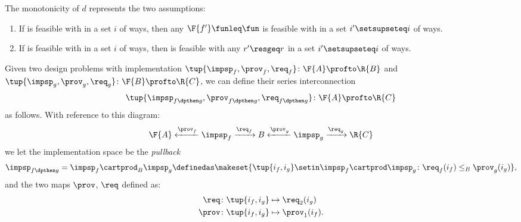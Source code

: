 {    \noindent The monotonicity of $d$ represents the two assumptions:
    \begin{enumerate}
        \item If \fun is feasible with \res in a set $i$ of ways, then any $\F{f'}\funleq \fun$ is feasible with \res in a set $i'\setsupseteq i$ of ways.
        \item If \fun is feasible with \res in a set $i$ of ways, then \fun is feasible with any $r'\resgeq r$ in a set $i'\setsupseteq i$ of ways.
    \end{enumerate}

    \begin{definition}
        \label{def:seriesdpi}
        Given two design problems with implementation $\tup{\impsp_f,\prov_f,\req_f}\colon \F{A}\profto \R{B}$ and $\tup{\impsp_g,\prov_g,\req_g}\colon \F{B}\profto \R{C}$, we can define their series interconnection
        \begin{equation}
            \tup{\impsp_{f\dpthen g},\prov_{f\dpthen g},\req_{f\dpthen g}}\colon \F{A}\profto \R{C}
        \end{equation}
        as follows.
        With reference to this diagram:
        \begin{equation}
            \F{A} \xleftarrow{\prov_f} \impsp_f \xrightarrow{\req_f} B
            \xleftarrow{\prov_g} \impsp_g \xrightarrow{\req_g} \R{C}
        \end{equation}
        we let the implementation space be the \emph{pullback}
        \begin{equation}
            \begin{aligned}
                \impsp_{f\dpthen g} & = \impsp_f \cartprod_B \impsp_g \definedas \makeset{
                    \tup{i_f,i_g} \setin \impsp_f \cartprod \impsp_g \colon
                    \req_f(i_f) \leq_{B} \prov_g(i_g)
                }, \\
            \end{aligned}
        \end{equation}
        and the two maps $\prov$, $\req$ defined as:
        \begin{equation}
            \begin{aligned}
                \req  & \colon \tup{i_f,i_g} \mapsto \req_2(i_g) \\
                \prov & \colon  \tup{i_f,i_g} \mapsto \prov_1(i_f).
            \end{aligned}
        \end{equation}

\end{definition}}
